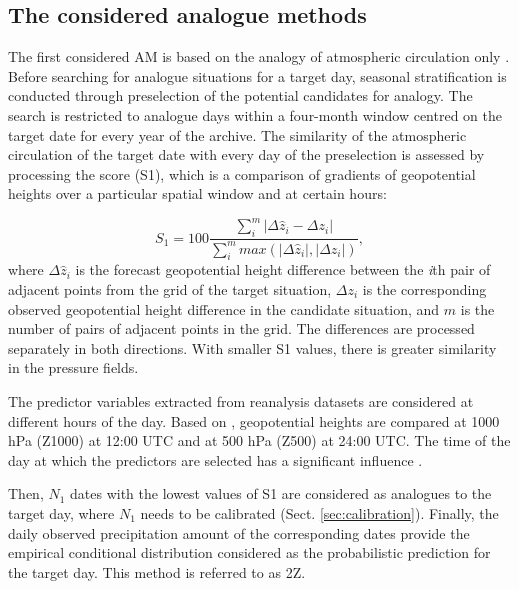 \documentclass[hess, manuscript]{copernicus}
\begin{document}
	\subsection{The considered analogue methods}
	\label{sec:analog_method}
	
	The first considered AM is based on the analogy of atmospheric circulation only \citep[Table \ref{table:method_2Z};][]{Obled2002, Bontron2005}. Before searching for analogue situations for a target day, seasonal stratification is conducted through preselection of the potential candidates for analogy. The search is restricted to analogue days within a four-month window centred on the target date for every year of the archive. The similarity of the atmospheric circulation of the target date with every day of the preselection is assessed by processing the \citet{Teweles1954} score (S1), which is a comparison of gradients of geopotential heights over a particular spatial window and at certain hours:
	
	\begin{equation}
	\label{eq:S1}
	S_{1}=100 \frac {\displaystyle \sum_{i}^{m} \vert \Delta\hat{z}_{i} - \Delta z_{i} \vert}
	{\displaystyle \sum_{i}^{m} max( \vert \Delta\hat{z}_{i} \vert , \vert \Delta z_{i} \vert ) } ,
	\end{equation}
	where $\Delta \hat{z}_{i}$ is the forecast geopotential height difference between the \textit{i}th pair of adjacent points from the grid of the target situation, $\Delta z_{i}$ is the corresponding observed geopotential height difference in the candidate situation, and $m$ is the number of pairs of adjacent points in the grid. The differences are processed separately in both directions. With smaller S1 values, there is greater similarity in the pressure fields.
	
	The predictor variables extracted from reanalysis datasets are considered at different hours of the day. Based on \citet{Bontron2005}, geopotential heights are compared at 1000 hPa (Z1000) at 12:00 UTC and at 500 hPa (Z500) at 24:00 UTC. The time of the day at which the predictors are selected has a significant influence \citep{Bontron2004}.
	
	Then, $N_{1}$ dates with the lowest values of S1 are considered as analogues to the target day, where $N_{1}$ needs to be calibrated (Sect. \ref{sec:calibration}). Finally, the daily observed precipitation amount of the corresponding dates provide the empirical conditional distribution considered as the probabilistic prediction for the target day. This method is referred to as 2Z.
	
\end{document}
